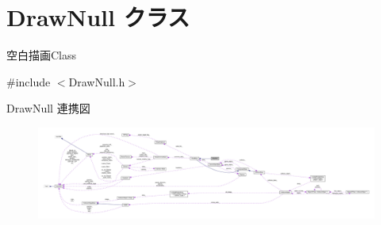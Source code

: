 \hypertarget{class_draw_null}{}\section{Draw\+Null クラス}
\label{class_draw_null}


空白描画\+Class  




{\ttfamily \#include $<$Draw\+Null.\+h$>$}



Draw\+Null 連携図\nopagebreak
\begin{figure}[H]
\begin{center}
\leavevmode
\includegraphics[width=350pt]{class_draw_null__coll__graph}
\end{center}
\end{figure}
